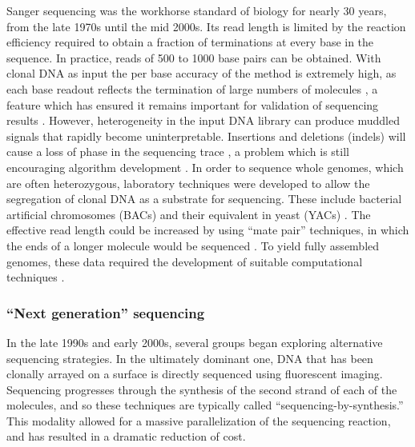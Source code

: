 Sanger sequencing was the workhorse standard of biology for nearly 30 years, from the late 1970s until the mid 2000s.
Its read length is limited by the reaction efficiency required to obtain a fraction of terminations at every base in the sequence.
In practice, reads of 500 to 1000 base pairs can be obtained.
With clonal DNA as input the per base accuracy of the method is extremely high, as each base readout reflects the termination of large numbers of molecules \cite{castiblanco2013primer}, a feature which has ensured it remains important for validation of sequencing results \cite{sikkema2013targeted}.
However, heterogeneity in the input DNA library can produce muddled signals that rapidly become uninterpretable.
Insertions and deletions (indels) will cause a loss of phase in the sequencing trace \cite{tenney2007tale}, a problem which is still encouraging algorithm development \cite{hill2014poly}.
In order to sequence whole genomes, which are often heterozygous, laboratory techniques were developed to allow the segregation of clonal DNA as a substrate for sequencing.
These include bacterial artificial chromosomes (BACs) and their equivalent in yeast (YACs) \cite{monaco1994yacs}.
The effective read length could be increased by using ``mate pair'' techniques, in which the ends of a longer molecule would be sequenced \cite{schmitt1996framework}.
To yield fully assembled genomes, these data required the development of suitable computational techniques \cite{myers2000whole}.

\subsubsection{``Next generation'' sequencing}

In the late 1990s and early 2000s, several groups began exploring alternative sequencing strategies.
In the ultimately dominant one, DNA that has been clonally arrayed on a surface is directly sequenced using fluorescent imaging.
Sequencing progresses through the synthesis of the second strand of each of the molecules, and so these techniques are typically called ``sequencing-by-synthesis.''
This modality allowed for a massive parallelization of the sequencing reaction, and has resulted in a dramatic reduction of cost.

